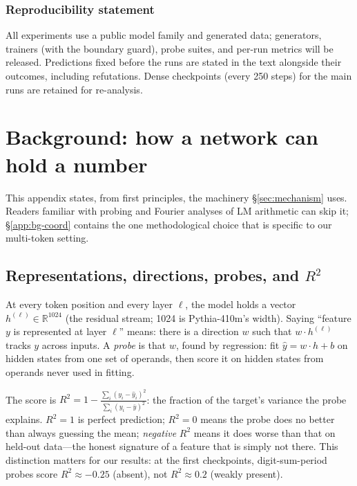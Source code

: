 \documentclass{article} %
\begin{document}
\subsubsection*{Reproducibility statement}
All experiments use a public model family and generated data; generators, trainers (with the boundary guard), probe suites, and per-run metrics will be released. Predictions fixed before the runs are stated in the text alongside their outcomes, including refutations. Dense checkpoints (every 250 steps) for the main runs are retained for re-analysis.




\appendix

\section{Background: how a network can hold a number}
\label{app:background}

This appendix states, from first principles, the machinery \S\ref{sec:mechanism} uses. Readers familiar with probing and Fourier analyses of LM arithmetic can skip it; \S\ref{app:bg-coord} contains the one methodological choice that is specific to our multi-token setting.

\subsection{Representations, directions, probes, and $R^2$}
\label{app:bg-probe}

At every token position and every layer $\ell$, the model holds a vector $h^{(\ell)} \in \mathbb{R}^{1024}$ (the residual stream; 1024 is Pythia-410m's width). Saying ``feature $y$ is represented at layer $\ell$'' means: there is a direction $w$ such that $w \cdot h^{(\ell)}$ tracks $y$ across inputs. A \emph{probe} is that $w$, found by regression: fit $\hat{y} = w \cdot h + b$ on hidden states from one set of operands, then score it on hidden states from operands never used in fitting.

The score is $R^2 = 1 - \frac{\sum_i (y_i - \hat{y}_i)^2}{\sum_i (y_i - \bar{y})^2}$: the fraction of the target's variance the probe explains. $R^2 = 1$ is perfect prediction; $R^2 = 0$ means the probe does no better than always guessing the mean; \emph{negative} $R^2$ means it does worse than that on held-out data---the honest signature of a feature that is simply not there. This distinction matters for our results: at the first checkpoints, digit-sum-period probes score $R^2 \approx -0.25$ (absent), not $R^2 \approx 0.2$ (weakly present).
\end{document}
